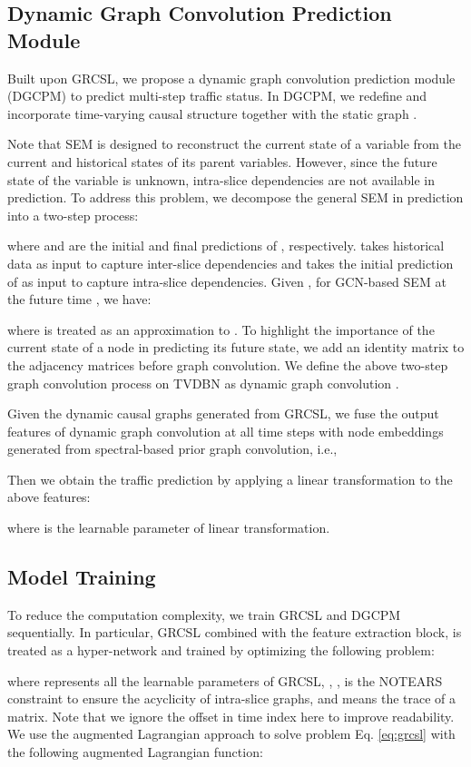 \documentclass[letterpaper, 10 pt, conference]{ieeeconf}
\begin{document}
\subsection{Dynamic Graph Convolution Prediction Module}
Built upon GRCSL, we propose a dynamic graph convolution prediction module (DGCPM) to predict multi-step traffic status. In DGCPM, we redefine  and incorporate time-varying causal structure  together with the static graph . 


Note that SEM is designed to reconstruct the current state of a variable from the current and historical states of its parent variables. However, since the future state of the variable is unknown, intra-slice dependencies are not available in prediction. To address this problem, we decompose the general SEM in prediction into a two-step process:

where  and  are the initial and final predictions of , respectively.  takes historical data as input to capture inter-slice dependencies and  takes the initial prediction of  as input to capture intra-slice dependencies. Given , for GCN-based SEM at the future time , we have:

where  is treated as an approximation to . To highlight the importance of the current state of a node in predicting its future state, we add an identity matrix to the adjacency matrices before graph convolution. We define the above two-step graph convolution process on TVDBN as dynamic graph convolution .

Given the dynamic causal graphs  generated from GRCSL, we fuse the output features of dynamic graph convolution at all time steps with node embeddings generated from spectral-based prior graph convolution, i.e.,

Then we obtain the traffic prediction by applying a linear transformation to the above features:

where  is the learnable parameter of linear transformation.

\subsection{Model Training}
To reduce the computation complexity, we train GRCSL and DGCPM sequentially. In particular, GRCSL combined with the feature extraction block, is treated as a hyper-network and trained by optimizing the following problem:

where  represents all the learnable parameters of GRCSL, , ,  is the NOTEARS constraint to ensure the acyclicity of intra-slice graphs, and  means the trace of a matrix. Note that we ignore the offset in time index here to improve readability. We use the augmented Lagrangian approach to solve problem Eq. \eqref{eq:grcsl} with the following augmented Lagrangian function\cite{yu2019dag}:
\end{document}
